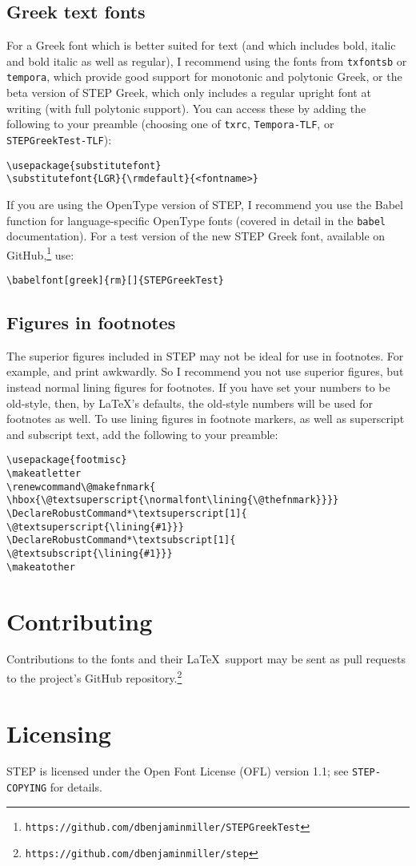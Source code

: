\documentclass[12pt]{article}
\makeatletter
\renewcommand\@makefnmark{\hbox{\@textsuperscript{\normalfont\lining{\@thefnmark}}}}
\DeclareRobustCommand*\textsuperscript[1]{\@textsuperscript{\lining{#1}}}
\DeclareRobustCommand*\textsubscript[1]{\@textsubscript{\lining{#1}}}
\makeatother
\begin{document}
\subsection{Greek text fonts}
For a Greek font which is better suited for text (and which includes bold, italic and bold italic as well as regular), I recommend using the fonts from \texttt{txfontsb} or \texttt{tempora}, which provide good support for monotonic and polytonic Greek, or the beta version of STEP Greek, which only includes a regular upright font at writing (with full polytonic support). You can access these by adding the following to your preamble (choosing one of \texttt{txrc}, \texttt{Tempora-TLF}, or \texttt{STEPGreekTest-TLF}):
\begin{verbatim}
\usepackage{substitutefont}
\substitutefont{LGR}{\rmdefault}{<fontname>}
\end{verbatim}

If you are using the OpenType version of STEP, I recommend you use the Babel function for language-specific OpenType fonts (covered in detail in the \texttt{babel} documentation). For a test version of the new STEP Greek font, available on GitHub,\footnote{\texttt{https://github.com/dbenjaminmiller/STEPGreekTest}} use:

\begin{verbatim}
\babelfont[greek]{rm}[]{STEPGreekTest}
\end{verbatim}

\subsection{Figures in footnotes}
The superior figures included in STEP may not be ideal for use in footnotes. For example,  and  print awkwardly. So I recommend you not use superior figures, but instead normal lining figures for footnotes. If you have set your numbers to be old-style, then, by \LaTeX's defaults, the old-style numbers will be used for footnotes as well. To use lining figures in footnote markers, as well as superscript and subscript text, add the following to your preamble:
\begin{verbatim}
\usepackage{footmisc}
\makeatletter
\renewcommand\@makefnmark{
\hbox{\@textsuperscript{\normalfont\lining{\@thefnmark}}}}
\DeclareRobustCommand*\textsuperscript[1]{
\@textsuperscript{\lining{#1}}}
\DeclareRobustCommand*\textsubscript[1]{
\@textsubscript{\lining{#1}}}
\makeatother
\end{verbatim}
\section{Contributing}
Contributions to the fonts and their \LaTeX\ support may be sent as pull requests to the project's GitHub repository.\footnote{\texttt{https://github.com/dbenjaminmiller/step}}
\section{Licensing}
STEP is licensed under the Open Font License (OFL) version 1.1; see \texttt{STEP-COPYING} for details.
\end{document}
